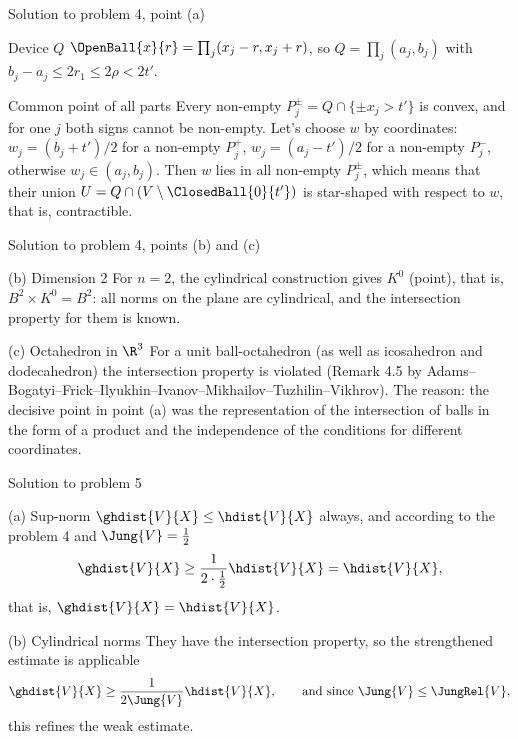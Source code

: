 \documentclass[aspectratio=169,11pt]{beamer}
\begin{document}
\begin{frame}{Solution to problem \textup{4}, point \textup{(a)}}
\begin{block}{Device $Q$}
$\OpenBall{x}{r} = \prod_j (x_j - r, x_j + r)$, so $Q = \prod_j (a_j, b_j)$ with $b_j - a_j \le 2r_1 \le 2\rho < 2t'$.
\end{block}
\begin{block}{Common point of all parts}
Every non-empty $P_j^{\pm} = Q \cap \{\pm x_j > t'\}$ is convex, and for one $j$ both signs cannot be non-empty. Let's choose $w$ by coordinates\textup{:} $w_j = (b_j + t')/2$ for a non-empty $P_j^{+}$, $w_j = (a_j - t')/2$ for a non-empty $P_j^{-}$, otherwise $w_j \in (a_j,b_j)$. Then $w$ lies in all non-empty $P_j^{\pm}$, which means that their union $U = Q \cap (V\setminus \ClosedBall{0}{t'})$ is star-shaped with respect to $w$, that is, contractible.
\end{block}
\end{frame}

\begin{frame}{Solution to problem \textup{4}, points \textup{(b)} and \textup{(c)}}
\begin{block}{\textup{(b)} Dimension \textup{2}}
For $n = 2$, the cylindrical construction gives $K^{0}$ \textup{(}point\textup{)}, that is, $B^2 \times K^0 = B^2$\textup{:} all norms on the plane are cylindrical, and the intersection property for them is known.
\end{block}
\begin{block}{\textup{(c)} Octahedron in $\R^3$}
For a unit ball-octahedron \textup{(}as well as icosahedron and dodecahedron\textup{)} the intersection property is violated \textup{(}Remark \textup{4.5} by Adams--Bogatyi--Frick--Ilyukhin--Ivanov--Mikhailov--Tuzhilin--Vikhrov\textup{)}. The reason\textup{:} the decisive point in point \textup{(a)} was the representation of the intersection of balls in the form of a product and the independence of the conditions for different coordinates.
\end{block}
\end{frame}

\begin{frame}{Solution to problem \textup{5}}
\begin{block}{\textup{(a)} Sup-norm}
$\ghdist{V}{X} \le \hdist{V}{X}$ always, and according to the problem \textup{4} and $\Jung{V} = \frac12$
\[
\ghdist{V}{X} \ge \frac{1}{2\cdot\frac12}\hdist{V}{X} = \hdist{V}{X},
\]
that is, $\ghdist{V}{X} = \hdist{V}{X}$.
\end{block}
\begin{block}{\textup{(b)} Cylindrical norms}
They have the intersection property, so the strengthened estimate is applicable
\[
\ghdist{V}{X} \ge \frac{1}{2\Jung{V}}\hdist{V}{X}, \qquad \text{and since } \Jung{V} \le \JungRel{V},
\]
this refines the weak estimate.
\end{block}
\end{frame}
\end{document}
